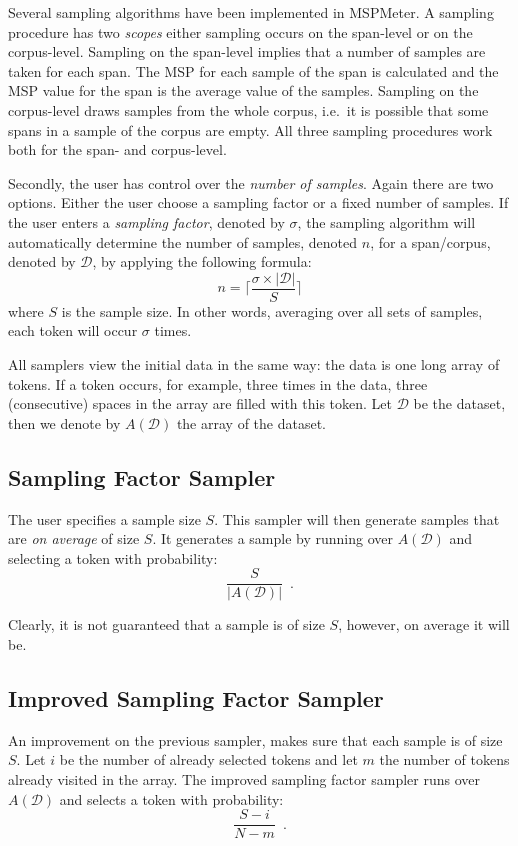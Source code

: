 \documentclass{article}
\begin{document}
Several sampling algorithms have been implemented in MSPMeter. A sampling procedure has two \emph{scopes} either sampling occurs on the span-level or on the corpus-level. Sampling on the span-level implies that a number of samples are taken for each span. The MSP for each sample of the span is calculated and the MSP value for the span is the average value of the samples. Sampling on the corpus-level draws samples from the whole corpus, i.e.\ it is possible that some spans in a sample of the corpus are empty. All three sampling procedures work both for the span- and corpus-level. 

Secondly, the user has control over the \emph{number of samples}. Again there are two options. Either the user choose a sampling factor or a fixed number of samples. If the user enters a \emph{sampling factor}, denoted by $\sigma$, the sampling algorithm will automatically determine the number of samples, denoted $n$, for a span/corpus, denoted by $\mathcal{D}$, by applying the following formula: 
$$n = \lceil \frac{\sigma \times |\mathcal{D}|}{S} \rceil$$
where $S$ is the sample size. In other words, averaging over all sets of samples, each token will occur $\sigma$ times. 

All samplers view the initial data in the same way: the data is one long array of tokens. If a token occurs, for example, three times in the data, three (consecutive) spaces in the array are filled with this token. Let $\mathcal{D}$ be the dataset, then we denote by $A(\mathcal{D})$ the array of the dataset.

\subsection{Sampling Factor Sampler}

The user specifies a sample size $S$. This sampler will then generate samples that are \emph{on average} of size $S$. It generates a sample by running over $A(\mathcal{D})$ and selecting a token with probability:
$$\frac{S}{|A(\mathcal{D})|} \enspace.$$

Clearly, it is not guaranteed that a sample is of size $S$, however, on average it will be.



\subsection{Improved Sampling Factor Sampler}

An improvement on the previous sampler, makes sure that each sample is of size $S$. Let $i$ be the number of already selected tokens and let $m$ the number of tokens already visited in the array. The improved sampling factor sampler runs over $A(\mathcal{D})$ and selects a token with probability:
$$\frac{S-i}{N-m} \enspace.$$ 
\end{document}
